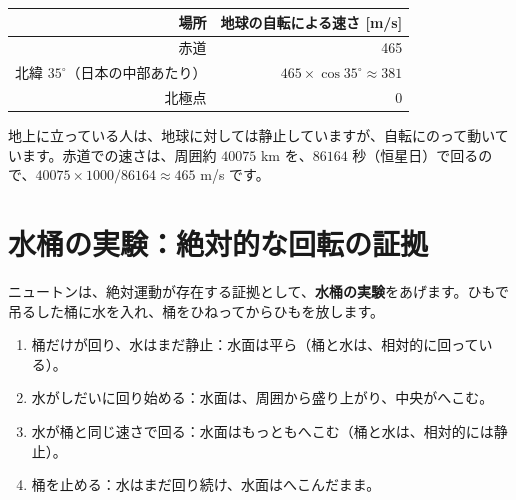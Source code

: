 \documentclass[a4paper,11pt,openany]{ltjsbook}
\begin{document}
\begin{center}
\begin{tabular}{rr}
\toprule
場所 & 地球の自転による速さ [m/s]\\
\midrule
赤道 & 465\\
北緯 $35^\circ$（日本の中部あたり） & $465\times\cos35^\circ\approx381$\\
北極点 & 0\\
\bottomrule
\end{tabular}
\end{center}

地上に立っている人は、地球に対しては静止していますが、自転にのって動いています。赤道での速さは、周囲約 $40075$ km を、$86164$ 秒（恒星日）で回るので、$40075\times1000/86164\approx465$ m/s です。

\section{水桶の実験：絶対的な回転の証拠}

ニュートンは、絶対運動が存在する証拠として、\textbf{水桶の実験}をあげます。ひもで吊るした桶に水を入れ、桶をひねってからひもを放します。

\begin{enumerate}[leftmargin=1.5em]
\item 桶だけが回り、水はまだ静止：水面は平ら（桶と水は、相対的に回っている）。
\item 水がしだいに回り始める：水面は、周囲から盛り上がり、中央がへこむ。
\item 水が桶と同じ速さで回る：水面はもっともへこむ（桶と水は、相対的には静止）。
\item 桶を止める：水はまだ回り続け、水面はへこんだまま。
\end{enumerate}
\end{document}
